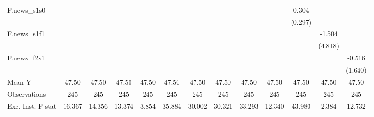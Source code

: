 {\begin{tabular}{l*{12}{c}}
\addlinespace
F.news\_s1s0 &                     &                     &                     &                     &                     &                     &                     &                     &                     &       0.304         &                     &                     \\
            &                     &                     &                     &                     &                     &                     &                     &                     &                     &     (0.297)         &                     &                     \\
\addlinespace
F.news\_s1f1 &                     &                     &                     &                     &                     &                     &                     &                     &                     &                     &      -1.504         &                     \\
            &                     &                     &                     &                     &                     &                     &                     &                     &                     &                     &     (4.818)         &                     \\
\addlinespace
F.news\_f2s1 &                     &                     &                     &                     &                     &                     &                     &                     &                     &                     &                     &      -0.516         \\
            &                     &                     &                     &                     &                     &                     &                     &                     &                     &                     &                     &     (1.640)         \\
\midrule
Mean Y      &       47.50         &       47.50         &       47.50         &       47.50         &       47.50         &       47.50         &       47.50         &       47.50         &       47.50         &       47.50         &       47.50         &       47.50         \\
Observations&         245         &         245         &         245         &         245         &         245         &         245         &         245         &         245         &         245         &         245         &         245         &         245         \\
Exc. Inst. F-stat&      16.367         &      14.356         &      13.374         &       3.854         &      35.884         &      30.002         &      30.321         &      33.293         &      12.340         &      43.980         &       2.384         &      12.732         \\
\bottomrule
\end{tabular}
}
